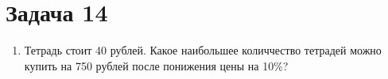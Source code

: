 \chapter{Задача 14}	
\begin{enumerate}
		
	\item Тетрадь стоит 40 рублей. Какое наибольшее количчество тетрадей можно купить на 750 рублей после понижения цены на 10\%?
	
\end{enumerate}